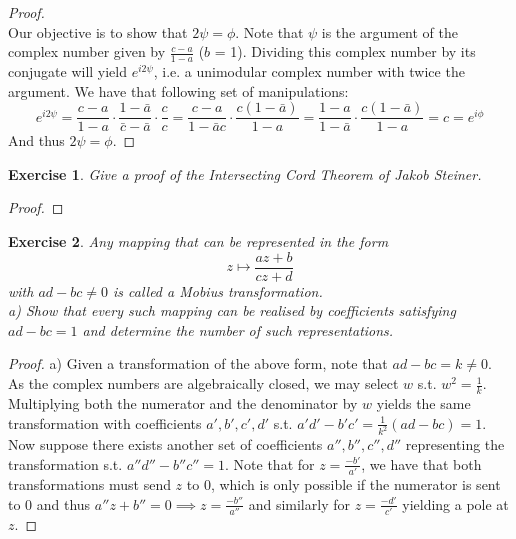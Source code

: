 \documentclass{article}
\newtheorem{exercise}{Exercise}
\begin{document}
\begin{proof}
\begin{tikzpicture}[x=0.75pt,y=0.75pt,yscale=-1,xscale=1]
\end{tikzpicture}
\\

Our objective is to show that $2\psi = \phi$. Note that $\psi$ is the argument of the complex number given by $\frac{c-a}{1-a}$ ($b$ = 1). Dividing this complex number by its conjugate will yield $e^{i2\psi}$, i.e. a unimodular complex number with twice the argument. We have that following set of manipulations:
\[ e^{i2\psi} = \frac{c-a}{1-a}\cdot \frac{1-\bar{a}}{\bar{c}-\bar{a}} \cdot \frac{c}{c} = \frac{c-a}{1-\bar{a}c} \cdot \frac{c(1-\bar{a})}{1-a} = \frac{1-a}{1-\bar{a}} \cdot \frac{c(1-\bar{a})}{1-a} = c = e^{i\phi} 
  \]
And thus $2 \psi = \phi$.
\end{proof}

\begin{exercise}
  Give a proof of the Intersecting Cord Theorem of Jakob Steiner.
\end{exercise}
\begin{proof}
  
\end{proof}

\begin{exercise}
  Any mapping that can be represented in the form \[z \mapsto \frac{az + b}{cz + d}\] with $ad -bc \neq 0$ is called a Mobius transformation. \\
a) Show that every such mapping can be realised by coefficients satisfying $ad-bc = 1$ and determine the number of such representations.
\end{exercise}
\begin{proof}
  a) Given a transformation of the above form, note that $ad-bc = k \neq 0$. As the complex numbers are algebraically closed, we may select $w$ s.t. $w^{2} = \frac{1}{k}$. Multiplying both the numerator and the denominator by $w$ yields the same transformation with coefficients $a', b', c', d'$ s.t. $a'd' - b'c' = \frac{1}{k^{2}}(ad-bc) = 1$. Now suppose there exists another set of coefficients $a'',b'', c'', d''$ representing the transformation s.t. $a''d'' - b''c'' = 1$. Note that for $z = \frac{-b'}{a'}$, we have that both transformations must send $z$ to 0, which is only possible if the numerator is sent to $0$ and thus $a''z + b'' = 0 \implies z = \frac{-b''}{a''}$ and similarly for $z = \frac{-d'}{c'}$ yielding a pole at $z$.    
  \end{proof}
\end{document}
